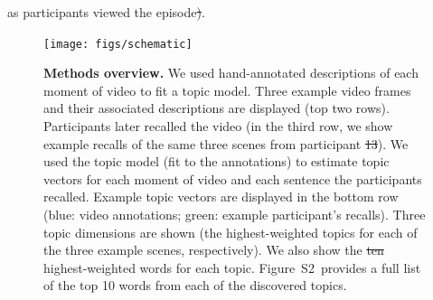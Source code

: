 \documentclass{article}
\newcommand{\topics}{S2}
\providecommand{\DIFaddtex}[1]{{\protect\color{blue}\uwave{#1}}} %
\providecommand{\DIFdeltex}[1]{{\protect\color{red}\sout{#1}}}                      %
\providecommand{\DIFdelbegin}{} %
\providecommand{\DIFdelend}{} %
\providecommand{\DIFaddFL}[1]{\DIFadd{#1}} %
\providecommand{\DIFdelFL}[1]{\DIFdel{#1}} %
\providecommand{\DIFaddbeginFL}{} %
\providecommand{\DIFaddendFL}{} %
\providecommand{\DIFdelbeginFL}{} %
\providecommand{\DIFdelendFL}{} %
\providecommand{\DIFadd}[1]{\texorpdfstring{\DIFaddtex{#1}}{#1}} %
\providecommand{\DIFdel}[1]{\texorpdfstring{\DIFdeltex{#1}}{}} %
\newcommand{\DIFscaledelfig}{0.5}
\newlength{\DIFdelgraphicswidth} %
\newlength{\DIFdelgraphicsheight} %
\newcommand{\DIFaddincludegraphics}[2][]{{\color{blue}\fbox{\DIFOincludegraphics[#1]{#2}}}} %
\newcommand{\DIFdelincludegraphics}[2][]{%
\sbox{\DIFdelgraphicsbox}{\DIFOincludegraphics[#1]{#2}}%
\settoboxwidth{\DIFdelgraphicswidth}{\DIFdelgraphicsbox} %
\settoboxtotalheight{\DIFdelgraphicsheight}{\DIFdelgraphicsbox} %
\scalebox{\DIFscaledelfig}{%
\parbox[b]{\DIFdelgraphicswidth}{\usebox{\DIFdelgraphicsbox}\\[-\baselineskip] \rule{\DIFdelgraphicswidth}{0em}}\llap{\resizebox{\DIFdelgraphicswidth}{\DIFdelgraphicsheight}{%
\setlength{\unitlength}{\DIFdelgraphicswidth}%
\begin{picture}(1,1)%
\thicklines\linethickness{2pt} %
{\color[rgb]{1,0,0}\put(0,0){\framebox(1,1){}}}%
{\color[rgb]{1,0,0}\put(0,0){\line( 1,1){1}}}%
{\color[rgb]{1,0,0}\put(0,1){\line(1,-1){1}}}%
\end{picture}%
}\hspace*{3pt}}} %
} %
\DeclareRobustCommand{\DIFdelbegin}{\DIFOdelbegin \let\includegraphics\DIFdelincludegraphics} %
\DeclareRobustCommand{\DIFdelend}{\DIFOaddend \let\includegraphics\DIFOincludegraphics} %
\DeclareRobustCommand{\DIFaddbeginFL}{\DIFOaddbeginFL \let\includegraphics\DIFaddincludegraphics} %
\DeclareRobustCommand{\DIFaddendFL}{\DIFOaddendFL \let\includegraphics\DIFOincludegraphics} %
\DeclareRobustCommand{\DIFdelbeginFL}{\DIFOdelbeginFL \let\includegraphics\DIFdelincludegraphics} %
\DeclareRobustCommand{\DIFdelendFL}{\DIFOaddendFL \let\includegraphics\DIFOincludegraphics} %
\begin{document}
as participants viewed the episode\DIFdelbegin \DIFdel{)}\DIFdelend .

\begin{figure}[tp]
\centering
\texttt{[image: figs/schematic]}
\caption{\small \textbf{Methods overview.} We used hand-annotated descriptions of each moment of video to fit a topic model.  Three example video frames and their associated descriptions are displayed (top two rows).  Participants later recalled the video (in the third row, we show example recalls of the same three scenes from participant \DIFdelbeginFL \DIFdelFL{13}\DIFdelendFL \DIFaddbeginFL \DIFaddFL{17}\DIFaddendFL ).  We used the topic model (fit to the annotations) to estimate topic vectors for each moment of video and each sentence the participants recalled.  Example topic vectors are displayed in the bottom row (blue: video annotations; green: example participant's recalls).  Three topic dimensions are shown (the highest-weighted topics for each of the three example scenes, respectively).  We also show the \DIFdelbeginFL \DIFdelFL{ten }\DIFdelendFL \DIFaddbeginFL \DIFaddFL{10 }\DIFaddendFL highest-weighted words for each topic.  Figure~\topics~provides a full list of the top 10 words from each of the discovered topics.}
\label{fig:schematic}
\end{figure}
\end{document}
